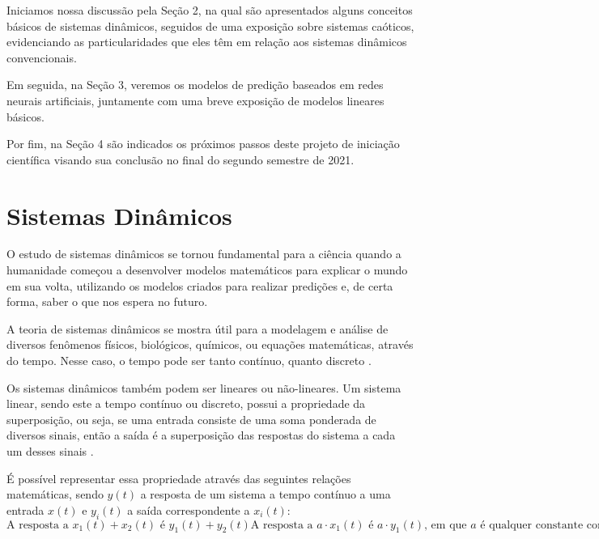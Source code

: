 \documentclass[a4paper, 12pt]{article}
\begin{document}
Iniciamos nossa discussão pela Seção 2, na qual são apresentados alguns conceitos básicos de sistemas dinâmicos, seguidos de uma exposição  sobre sistemas caóticos, evidenciando as particularidades que eles têm em relação aos sistemas dinâmicos convencionais.

Em seguida, na Seção 3, veremos os modelos de predição baseados em redes neurais artificiais, juntamente com uma breve exposição de modelos lineares básicos.

Por fim, na Seção 4 são indicados os próximos passos deste projeto de iniciação científica visando sua conclusão no final do segundo semestre de 2021. 

\section{Sistemas Dinâmicos}
O estudo de sistemas dinâmicos se tornou fundamental para a ciência quando a humanidade começou a desenvolver modelos matemáticos para explicar o mundo em sua volta, utilizando os modelos criados para realizar predições e, de certa forma, saber o que nos espera no futuro.

A teoria de sistemas dinâmicos se mostra útil para a modelagem e análise de diversos  fenômenos físicos, biológicos, químicos, ou equações matemáticas, através do tempo. Nesse caso, o tempo pode ser tanto contínuo, quanto discreto \cite{kluever2020dynamic}.

Os sistemas dinâmicos também podem ser lineares ou não-lineares. Um sistema linear, sendo este a tempo contínuo ou discreto, possui a propriedade da superposição, ou seja, se uma entrada consiste de uma soma ponderada de diversos sinais, então a saída é a superposição das respostas do sistema a cada um desses sinais \cite{oppenheim2014signals}. 

É possível representar essa propriedade através das seguintes relações matemáticas, sendo $y(t)$ a resposta de um sistema a tempo contínuo a uma entrada $x(t)$ e $y_i(t)$ a saída correspondente a $x_i(t)$:
\begin{subequations}
\begin{equation}\label{eq:linear-eq-1}
\text{A resposta a } x_1(t) + x_2(t) \text{ é } y_1(t) + y_2(t)
\end{equation}
\begin{equation}\label{eq:linear-eq-2}
\text{A resposta a } a\cdot x_1(t) \text{ é } a\cdot y_1(t)\text{, em que } a \text{ é qualquer constante complexa.}
\end{equation}
\end{subequations}
\end{document}
